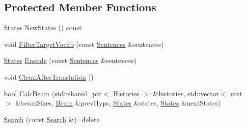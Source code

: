 \subsection*{Protected Member Functions}
\begin{DoxyCompactItemize}
\item 
\hyperlink{namespaceamunmt_a4fe2912e208820f8217fbcf229ebacf7}{States} \hyperlink{classamunmt_1_1Search_a1cd54cd91f09de25de5967d0704dc77d}{New\+States} () const 
\item 
void \hyperlink{classamunmt_1_1Search_adab7a84cbd820e7395a3f79fc604bb06}{Filter\+Target\+Vocab} (const \hyperlink{classamunmt_1_1Sentences}{Sentences} \&sentences)
\item 
\hyperlink{namespaceamunmt_a4fe2912e208820f8217fbcf229ebacf7}{States} \hyperlink{classamunmt_1_1Search_aeca132502f793a9cf8f54ba5e12a333a}{Encode} (const \hyperlink{classamunmt_1_1Sentences}{Sentences} \&sentences)
\item 
void \hyperlink{classamunmt_1_1Search_acdf0343e135ef26bf53ebb9389b379f6}{Clean\+After\+Translation} ()
\item 
bool \hyperlink{classamunmt_1_1Search_a80d628a5581c65ebe73fe0b941497eba}{Calc\+Beam} (std\+::shared\+\_\+ptr$<$ \hyperlink{classamunmt_1_1Histories}{Histories} $>$ \&histories, std\+::vector$<$ uint $>$ \&beam\+Sizes, \hyperlink{namespaceamunmt_a534a3a9a1d99c01a5adf05e700a26012}{Beam} \&prev\+Hyps, \hyperlink{namespaceamunmt_a4fe2912e208820f8217fbcf229ebacf7}{States} \&states, \hyperlink{namespaceamunmt_a4fe2912e208820f8217fbcf229ebacf7}{States} \&next\+States)
\item 
\hyperlink{classamunmt_1_1Search_a4c25f77fc140b60ce1b2b847478b58ed}{Search} (const \hyperlink{classamunmt_1_1Search}{Search} \&)=delete
\end{DoxyCompactItemize}
